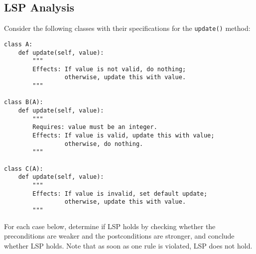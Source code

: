 \documentclass[oneside,11pt,dvipsnames]{book}
\newcommand{\code}[1]{\texttt{#1}}
\begin{document}
\subsection{LSP Analysis}

Consider the following classes with their specifications for the \code{update()} method:

\begin{lstlisting}
class A:
    def update(self, value):
        """
        Effects: If value is not valid, do nothing;
                 otherwise, update this with value.
        """

class B(A):
    def update(self, value):
        """
        Requires: value must be an integer.
        Effects: If value is valid, update this with value;
                 otherwise, do nothing.
        """

class C(A):
    def update(self, value):
        """
        Effects: If value is invalid, set default update;
                 otherwise, update this with value.
        """
\end{lstlisting}    

For each case below, determine if LSP holds by checking whether the preconditions are weaker and the postconditions are stronger, and conclude whether LSP holds. Note that as soon as one rule is violated, LSP does not hold.
\end{document}
